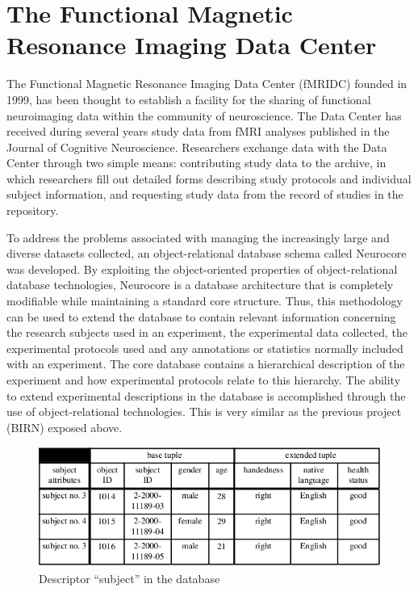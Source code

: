 \section{The Functional Magnetic Resonance Imaging Data Center}
\par
{}
The Functional Magnetic Resonance Imaging Data Center (fMRIDC) founded in 1999, has been thought to establish a facility for the sharing of functional neuroimaging data within the community of neuroscience. The Data Center has received during several years study data from fMRI analyses published in the Journal of Cognitive Neuroscience. Researchers exchange data with the Data Center through two simple means: contributing study data to the archive, in which researchers fill out detailed forms describing study protocols and individual subject information, and requesting study data from the record of studies in the repository.
\par
To address the problems associated with managing the increasingly large and diverse datasets collected, an object-relational database schema called Neurocore was developed. By exploiting the object-oriented properties of object-relational database technologies, Neurocore is a database architecture that is completely modifiable while maintaining a standard core structure.  Thus, this methodology can be used to extend the database to contain relevant information concerning the research subjects used in an experiment, the experimental data collected, the experimental protocols used and any annotations or statistics normally included with an experiment. The core database contains a hierarchical description of the experiment and how experimental protocols relate to this hierarchy. The ability to extend experimental descriptions in the database is accomplished through the use of object-relational technologies. This is very similar as the previous project (BIRN) exposed above.
\begin{figure}[!h]
\begin{center}
\includegraphics[scale=0.8]{images/fMRIDC_descriptor.png}
\caption{\small Descriptor ``subject'' in the database\protect\footnotemark}
\end{center}
\end{figure}
